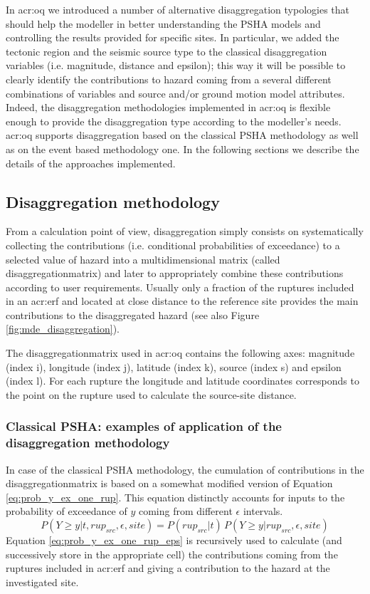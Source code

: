 In \gls{acr:oq} we introduced a number of alternative disaggregation 
typologies that should help the modeller in better understanding the 
PSHA models and controlling the results provided for specific sites.
% 
In particular, we added the tectonic region and the seismic source type 
to the classical disaggregation variables (i.e. magnitude, distance and
epsilon); this way it will be possible to clearly identify the 
contributions to hazard coming from a several different combinations 
of variables and source and/or ground motion model attributes.
%
Indeed, the disaggregation methodologies implemented in \gls{acr:oq} is 
flexible enough to provide the disaggregation type according to the 
modeller's needs.
% 
\gls{acr:oq} supports disaggregation based on the classical PSHA 
methodology as well as on the event based methodology one. In the 
following sections we describe the details of the approaches
implemented.
%
\subsection{Disaggregation methodology}
From a calculation point of view, disaggregation simply consists 
on systematically collecting the contributions (i.e. conditional 
probabilities of exceedance) to a selected value of hazard into a 
multidimensional matrix (called \gls{disaggregationmatrix}) and  
later to appropriately combine these contributions according to user 
requirements.
Usually only a fraction of the ruptures included 
in an \gls{acr:erf} and located at close distance to the reference site
provides the main contributions to the disaggregated hazard (see also 
Figure \ref{fig:mde_disaggregation}).

The \gls{disaggregationmatrix} used in \gls{acr:oq} contains the
following axes: magnitude (index i), longitude (index j), latitude 
(index k), source (index s) and epsilon (index l).
%
For each rupture the longitude and latitude coordinates corresponds 
to the point on the rupture used to calculate the source-site distance.
%
\subsubsection{Classical PSHA: examples of application of the 
disaggregation methodology}
%
In case of the classical PSHA methodology, the cumulation of 
contributions in the \gls{disaggregationmatrix} is based on a 
somewhat modified version of Equation \ref{eq:prob_y_ex_one_rup}.
This equation distinctly accounts for inputs to the probability of 
exceedance of $y$ coming from different $\epsilon$ intervals.
%
\begin{equation}
P(Y \geq y|t,rup_{src},\epsilon,site) = 
	P(rup_{src}|t)\,
	P(Y\geq y|rup_{src},\epsilon,site)
\label{eq:prob_y_ex_one_rup_eps}
\end{equation}
%
Equation \ref{eq:prob_y_ex_one_rup_eps} is recursively used to 
calculate (and successively store in the appropriate cell) the 
contributions coming from the ruptures included in 
\gls{acr:erf} and giving a contribution to the hazard at the 
investigated site. 
%
%
